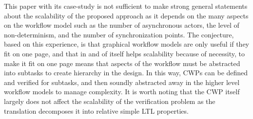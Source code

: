 This paper with its case-study is not sufficient to make strong general statements about the scalability of the proposed approach as it depends on the many aspects on the workflow model such as the number of asynchronous actors, the level of non-determinism, and the number of synchronization points. The conjecture, based on this experience, is that graphical workflow models are only useful if they fit on one page, and that in and of itself helps scalability because of necessity, to make it fit on one page means that aspects of the workflow must be abstracted into subtasks to create hierarchy in the design. In this way, CWPs can be defined and verified for subtasks, and then soundly abstracted away in the higher level workflow models to manage complexity. It is worth noting that the CWP itself largely does not affect the scalability of the verification problem as the translation decomposes it into relative simple LTL properties.